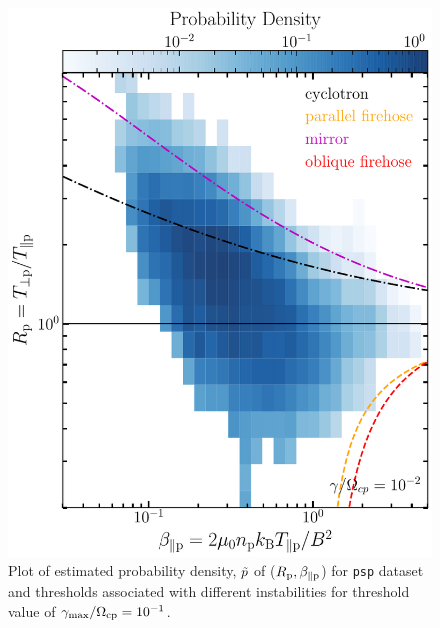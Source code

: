     \begin{figure}
        \begin{center}
            \includegraphics[width=1\textwidth]{figures/apdxA/brazil_prob_psp.pdf}
            \caption[Brazil-plot of \texttt{psp} dataset]{Plot of estimated probability density,
            $\Tilde{p}$ of ($R_{\rm p}, \beta_{\parallel \rm p}$) for \texttt{psp} dataset and
            thresholds associated with different instabilities for threshold value of
            $\gamma_{\max}/\Omega_{\rm cp} = 10^{-1}$.}
            \label{fig:brazil_prob_psp}
        \end{center}
    \end{figure}